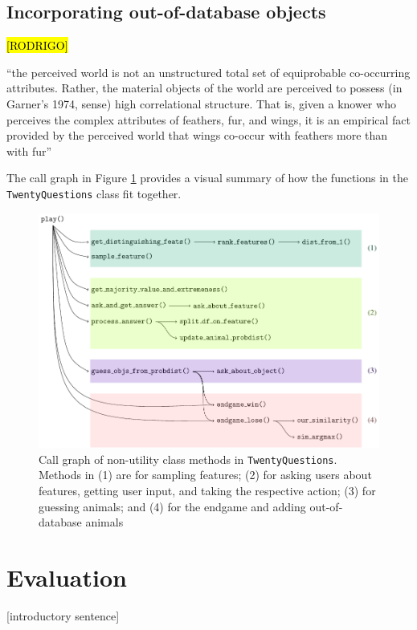 \documentclass[11pt,a4paper]{article}
\begin{document}
\subsection{Incorporating out-of-database objects}
\label{subsec:out-of-db}

\hl{[RODRIGO]}

``the perceived world is not an unstructured total set of equiprobable co-occurring attributes. Rather, the material objects of the world are perceived to possess (in Garner's 1974, sense) high correlational structure.
That is, given a knower who perceives the complex attributes of feathers, fur, and wings, it is an empirical fact provided by the perceived world that wings co-occur with feathers more than with fur'' \citep[29]{Rosch1978}

The call graph in Figure \ref{fig:call-graph} provides a visual summary of how the functions in the \texttt{TwentyQuestions} class fit together.

\begin{figure}
	\includegraphics[width=.9\linewidth]{graphics/call_graph.pdf}
	\caption{Call graph of non-utility class methods in \texttt{TwentyQuestions}. Methods in (1) are for sampling features; (2) for asking users about features, getting user input, and taking the respective action; (3) for guessing animals; and (4) for the endgame and adding out-of-database animals}
	\label{fig:call-graph}
\end{figure}

\section{Evaluation}
\label{sec:eval}

[introductory sentence]
\end{document}
